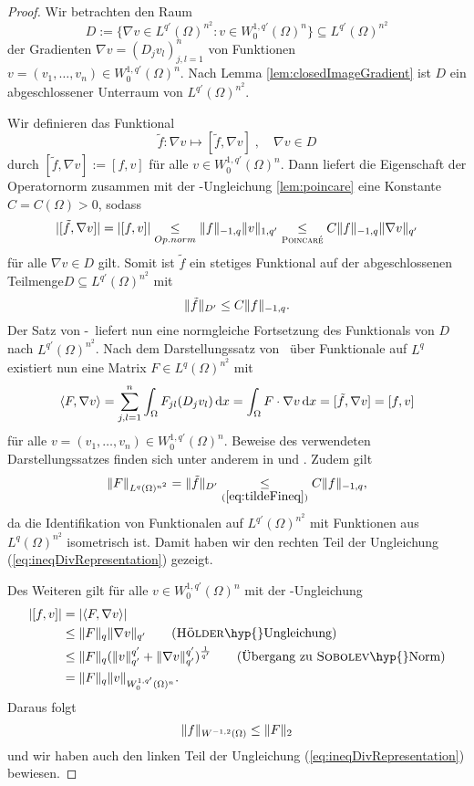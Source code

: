\begin{proof}
  Wir betrachten den Raum
  $$
  D := \{\nabla v \in L^{q'}(\Omega)^{n^2} \colon v \in W_0^{1,q'}(\Omega)^n\} \subseteq L^{q'}(\Omega)^{n^2}
  $$
  der Gradienten $\nabla v = (D_j v_l)_{j,l=1}^n$ von Funktionen $v = (v_1,\dots,v_n) \in W_0^{1,q'}(\Omega)^n$.
  Nach Lemma \ref{lem:closedImageGradient} ist $D$ ein abgeschlossener Unterraum von $L^{q'}(\Omega)^{n^2}$.

  Wir definieren das Funktional
  $$
  \tilde f \colon \nabla v \mapsto [\tilde f, \nabla v]\;, \quad \nabla v \in D
  $$
  durch $[\tilde f, \nabla v] := [f, v]$ für alle $v \in W_0^{1,q'}(\Omega)^n$.
  Dann liefert die Eigenschaft der Operatornorm zusammen mit der \poincare\hyp{}Ungleichung \ref{lem:poincare} eine Konstante $C = C(\Omega) > 0$, sodass 
  $$
  |[\tilde f, \nabla v]| 
  = |[f, v]| 
  \underset{Op.norm}{\leq} \norm{f}_{-1,q} \norm{v}_{1,q'}
  \underset{\poincare}{\leq} C \norm{f}_{-1,q} \norm{\nabla v }_{q'}
  $$
  für alle $\nabla v \in D$ gilt.
  Somit ist $\tilde f$ ein stetiges Funktional auf der abgeschlossenen Teilmenge$D \subseteq L^{q'}(\Omega)^{n^2}$ mit 
  \begin{equation}
    \label{eq:tildeFineq}
    \norm{\tilde f}_{D'} \leq C\norm{f}_{-1,q}.
  \end{equation}
  Der Satz von \hahn\hyp{}\banach\ liefert nun eine normgleiche Fortsetzung des Funktionals von $D$ nach $L^{q'}(\Omega)^{n^2}$.
  Nach dem Darstellungssatz von \riesz\ über Funktionale auf $L^{q}$  existiert nun eine Matrix $F \in L^{q}(\Omega)^{n^2}$ mit
  $$
  \langle F, \nabla v \rangle
  = \sum_{j,l=1}^n \int_\Omega F_{jl}(D_j v_l) \d x
  = \int_\Omega F \cdot \nabla v \d x
  = [\tilde f, \nabla v] 
  = [f, v]
  $$
  für alle $v = (v_1,\dots,v_n) \in W_0^{1,q'}(\Omega)^n$.
  Beweise des verwendeten Darstellungssatzes finden sich unter anderem in \cite[S.47, Theorem 2.44]{adams2003sobolev} und \cite[S.60, Satz II.2.4]{werner2011fa}.
  Zudem gilt
  $$ 
  \norm{F}_{L^q(\Omega)^{n^2}} 
  = \norm{\tilde f}_{D'} 
  \underset{(\ref{eq:tildeFineq})}{\leq} C \norm{f}_{-1,q},$$
  da die Identifikation von Funktionalen auf $L^{q'}(\Omega)^{n^2}$ mit Funktionen aus $L^q(\Omega)^{n^2}$ isometrisch ist.
  Damit haben wir den rechten Teil der Ungleichung (\ref{eq:ineqDivRepresentation}) gezeigt.

  Des Weiteren gilt für alle $v \in W_0^{1,q'}(\Omega)^n$ mit der \hoelder\hyp{}Ungleichung
  \begin{align*}
    |[f,v]| 
    &= |\langle F, \nabla v\rangle|  \\
    &\leq \norm{F}_q \norm{\nabla v}_{q'}  \tag{\hoelder\hyp{}Ungleichung}\\
    &\leq \norm{F}_q (\norm{v}_{q'}^{q'} + \norm{\nabla v}_{q'}^{q'})^{\frac{1}{q'}} \tag{Übergang zu \sobolev\hyp{}Norm}\\
    &= \norm{F}_q \norm{v}_{W_0^{1,q'}(\Omega)^n}.
  \end{align*}
  Daraus folgt
  $$
  \norm{f}_{W^{-1,2}(\Omega)} \leq \norm{F}_2
  $$
  und wir haben auch den linken Teil der Ungleichung (\ref{eq:ineqDivRepresentation}) bewiesen.


\end{proof}
